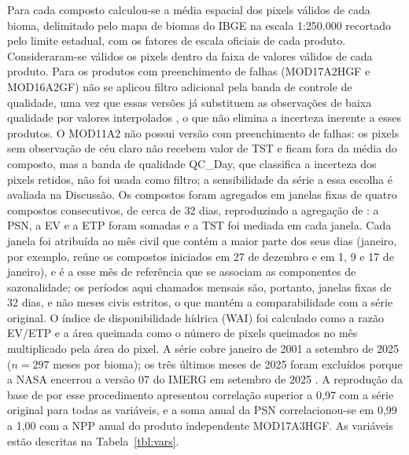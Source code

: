 \documentclass[a4paper,fleqn]{cas-dc}
\begin{document}
Para cada composto calculou-se a média espacial dos pixels válidos de cada bioma, delimitado pelo mapa de biomas do IBGE na escala 1:250.000 \citep{ibge2019} recortado pelo limite estadual, com os fatores de escala oficiais de cada produto. Consideraram-se válidos os pixels dentro da faixa de valores válidos de cada produto. Para os produtos com preenchimento de falhas (MOD17A2HGF e MOD16A2GF) não se aplicou filtro adicional pela banda de controle de qualidade, uma vez que essas versões já substituem as observações de baixa qualidade por valores interpolados \citep{running2021gpp}, o que não elimina a incerteza inerente a esses produtos. O MOD11A2 não possui versão com preenchimento de falhas: os pixels sem observação de céu claro não recebem valor de TST e ficam fora da média do composto, mas a banda de qualidade QC\_Day, que classifica a incerteza dos pixels retidos, não foi usada como filtro; a sensibilidade da série a essa escolha é avaliada na Discussão. Os compostos foram agregados em janelas fixas de quatro compostos consecutivos, de cerca de 32 dias, reproduzindo a agregação de \citet{benfica2022,benfica2023}: a PSN, a EV e a ETP foram somadas e a TST foi mediada em cada janela. Cada janela foi atribuída ao mês civil que contém a maior parte dos seus dias (janeiro, por exemplo, reúne os compostos iniciados em 27 de dezembro e em 1, 9 e 17 de janeiro), e é a esse mês de referência que se associam as componentes de sazonalidade; os períodos aqui chamados mensais são, portanto, janelas fixas de 32 dias, e não meses civis estritos, o que mantém a comparabilidade com a série original. O índice de disponibilidade hídrica (WAI) foi calculado como a razão EV/ETP e a área queimada como o número de pixels queimados no mês multiplicado pela área do pixel. A série cobre janeiro de 2001 a setembro de 2025 ($n = 297$ meses por bioma); os três últimos meses de 2025 foram excluídos porque a NASA encerrou a versão 07 do IMERG em setembro de 2025 \citep{nasa2026}. A reprodução da base de \citet{benfica2023} por esse procedimento apresentou correlação superior a 0,97 com a série original para todas as variáveis, e a soma anual da PSN correlacionou-se em 0,99 a 1,00 com a NPP anual do produto independente MOD17A3HGF. As variáveis estão descritas na Tabela~\ref{tbl:vars}.
\end{document}
